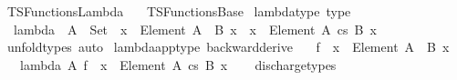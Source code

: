 %
\begin{isabellebody}%
%
%
\isadelimdocument
%
\endisadelimdocument
%
\isatagdocument
%
\isamarkuptrue%
%
\endisatagdocument
{\isafolddocument}%
%
\isadelimdocument
%
\endisadelimdocument
%
\isadelimtheory
%
\endisadelimtheory
%
\isatagtheory
{}\isamarkupfalse%
\ TSFunctions{\isacharunderscore}{\kern0pt}Lambda\isanewline
\ \ \ TSFunctions{\isacharunderscore}{\kern0pt}Base\isanewline
{}%
\endisatagtheory
{\isafoldtheory}%
%
\isadelimtheory
\isanewline
%
\endisadelimtheory
\isanewline
{}\isamarkupfalse%
\ lambda{\isacharunderscore}{\kern0pt}type\ {\isacharbrackleft}{\kern0pt}type{\isacharbrackright}{\kern0pt}{\isacharcolon}{\kern0pt}\isanewline
\ \ {\isachardoublequoteopen}lambda\ {\isacharcolon}{\kern0pt}\ {\isacharparenleft}{\kern0pt}A\ {\isacharcolon}{\kern0pt}\ Set{\isacharparenright}{\kern0pt}\ {\isasymRightarrow}\ {\isacharparenleft}{\kern0pt}{\isacharparenleft}{\kern0pt}x\ {\isacharcolon}{\kern0pt}\ Element\ A{\isacharparenright}{\kern0pt}\ {\isasymRightarrow}\ B\ x{\isacharparenright}{\kern0pt}\ {\isasymRightarrow}\ {\isacharparenleft}{\kern0pt}x\ {\isacharcolon}{\kern0pt}\ Element\ A{\isacharparenright}{\kern0pt}\ {\isasymrightarrow}cs\ B\ x{\isachardoublequoteclose}\isanewline
%
\isadelimproof
\ \ %
\endisadelimproof
%
\isatagproof
{}\isamarkupfalse%
\ unfold{\isacharunderscore}{\kern0pt}types\ auto%
\endisatagproof
{\isafoldproof}%
%
\isadelimproof
\isanewline
%
\endisadelimproof
\isanewline
\isanewline
{}\isamarkupfalse%
\ lambda{\isacharunderscore}{\kern0pt}app{\isacharunderscore}{\kern0pt}type\ {\isacharbrackleft}{\kern0pt}backward{\isacharunderscore}{\kern0pt}derive{\isacharbrackright}{\kern0pt}{\isacharcolon}{\kern0pt}\isanewline
\ \ \ {\isachardoublequoteopen}f\ {\isacharcolon}{\kern0pt}\ {\isacharparenleft}{\kern0pt}x\ {\isacharcolon}{\kern0pt}\ Element\ A{\isacharparenright}{\kern0pt}\ {\isasymRightarrow}\ B\ x{\isachardoublequoteclose}\isanewline
\ \ \ {\isachardoublequoteopen}lambda\ A\ f\ {\isacharcolon}{\kern0pt}\ {\isacharparenleft}{\kern0pt}x\ {\isacharcolon}{\kern0pt}\ Element\ A{\isacharparenright}{\kern0pt}\ {\isasymrightarrow}cs\ B\ x{\isachardoublequoteclose}\isanewline
%
\isadelimproof
\ \ %
\endisadelimproof
%
\isatagproof
{}\isamarkupfalse%
\ discharge{\isacharunderscore}{\kern0pt}types%
\endisatagproof
{\isafoldproof}%
%
\isadelimproof

\end{isabellebody}
